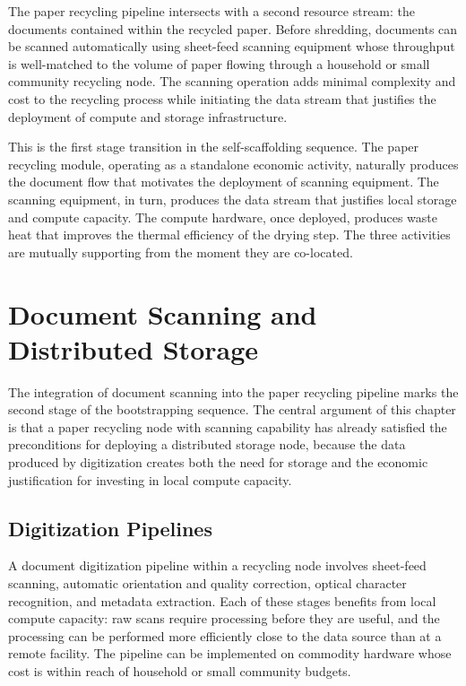 \documentclass[12pt]{book}
\theoremstyle{definition}
\theoremstyle{remark}
\begin{document}
The paper recycling pipeline intersects with a second resource stream:
the documents contained within the recycled paper. Before shredding,
documents can be scanned automatically using sheet-feed scanning
equipment whose throughput is well-matched to the volume of paper
flowing through a household or small community recycling node. The
scanning operation adds minimal complexity and cost to the recycling
process while initiating the data stream that justifies the deployment
of compute and storage infrastructure.

This is the first stage transition in the self-scaffolding sequence.
The paper recycling module, operating as a standalone economic
activity, naturally produces the document flow that motivates the
deployment of scanning equipment. The scanning equipment, in turn,
produces the data stream that justifies local storage and compute
capacity. The compute hardware, once deployed, produces waste heat
that improves the thermal efficiency of the drying step. The three
activities are mutually supporting from the moment they are
co-located.

\chapter{Document Scanning and Distributed Storage}

The integration of document scanning into the paper recycling pipeline
marks the second stage of the bootstrapping sequence. The central
argument of this chapter is that a paper recycling node with scanning
capability has already satisfied the preconditions for deploying
a distributed storage node, because the data produced by digitization
creates both the need for storage and the economic justification for
investing in local compute capacity.

\section{Digitization Pipelines}

A document digitization pipeline within a recycling node involves
sheet-feed scanning, automatic orientation and quality correction,
optical character recognition, and metadata extraction. Each of
these stages benefits from local compute capacity: raw scans require
processing before they are useful, and the processing can be
performed more efficiently close to the data source than at a remote
facility. The pipeline can be implemented on commodity hardware
whose cost is within reach of household or small community budgets.
\end{document}
